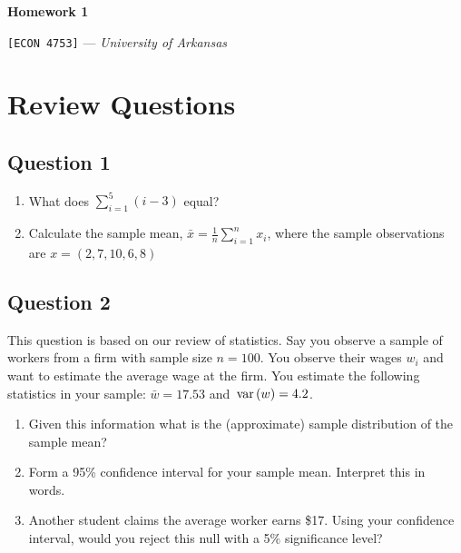 \documentclass[12pt]{article}
\begin{document}
\begin{center}
  {\Huge\bf Homework 1}
  
  \smallskip
  {\large\texttt{[ECON 4753]} — \textit{University of Arkansas}}

\end{center}

\section*{Review Questions}

\subsection*{Question 1}

\begin{enumerate}[label=(\alph*)]
  \item What does $\sum_{i = 1}^5 (i - 3)$ equal?

  \item Calculate the sample mean, $\bar{x} = \frac{1}{n} \sum_{i = 1}^n x_i$, where the sample observations are $x = (2, 7, 10, 6, 8)$ 
\end{enumerate}

\subsection*{Question 2}

This question is based on our review of statistics. Say you observe a
sample of workers from a firm with sample size \(n = 100\). You observe
their wages \(w_i\) and want to estimate the average wage at the firm.
You estimate the following statistics in your sample:
\(\bar{w} = 17.53\) and \(\var{w} = 4.2\).

\medskip
\begin{enumerate}[label=(\alph*)]
  \item Given this information what is the (approximate) sample distribution of the sample mean?

  \item Form a 95\% confidence interval for your sample mean. Interpret this in words.

  \item Another student claims the average worker earns \$17. 
  Using your confidence interval, would you reject this null with a 5\% significance level?
\end{enumerate}
\end{document}
